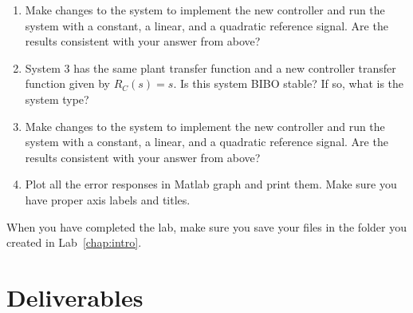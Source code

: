 \begin{enumerate}
    \item Make changes to the system to implement the new controller and run the
          system with a constant, a linear, and a quadratic reference signal.  Are the
          results consistent with your answer from above?

    \item System 3 has the same plant transfer function and a new
          controller transfer function given by \(R_{C}(s)=s\).  Is this system BIBO
          stable?  If so, what is the system type?

    \item Make changes to the system to implement the new controller and run the
          system with a constant, a linear, and a quadratic reference signal.  Are the
          results consistent with your answer from above?

    \item Plot all the error responses in \textsf{Matlab} graph and print them.
          Make sure you have proper axis labels and titles.
\end{enumerate}

When you have completed the lab, make sure you save your files in the folder
you created in Lab~\ref{chap:intro}\@.

\section{Deliverables}

